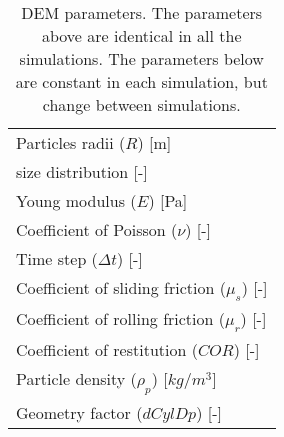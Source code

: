 \begin{table}[h]
\centering
\begin{tabular}{l}
\hline 
    Particles radii ($R$) [m]   \\ [5pt]

	size distribution [-] \\ [5pt]

    Young modulus ($E$) [Pa] \\ [5pt]

    Coefficient of Poisson ($\nu$) [-] \\ 
     Time step ($\Delta t$) [-] \\ [5pt]
        \hline
     Coefficient of sliding friction ($\mu_s$) [-] \\  [5pt]
    Coefficient of rolling friction ($\mu_r$) [-] \\ [5pt]
    Coefficient of restitution ($COR$) [-] \\ [5pt]
     Particle density ($\rho_p$) [$kg/m^3$] \\ [5pt]
    Geometry factor ($dCylDp$) [-] \\ [5pt]
   


\hline
\end{tabular}
\caption[DEM parameters]{DEM parameters. The parameters above are identical in
all the simulations. The parameters below are constant in each simulation, but
change between simulations.}
\label{tab:08DEMparameters}
\end{table}


